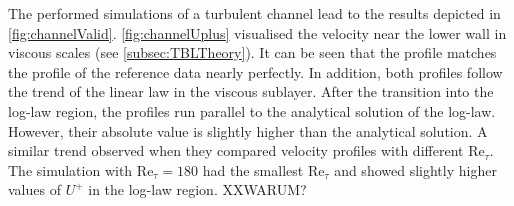 The performed simulations of a turbulent channel lead to the results depicted in \autoref{fig:channelValid}.
\autoref{fig:channelUplus} visualised the velocity near the lower wall in viscous scales (see \autoref{subsec:TBLTheory}).
It can be seen that the profile matches the profile of the reference data nearly perfectly.
In addition, both profiles follow the trend of the linear law in the viscous sublayer. 
After the transition into the log-law region, the profiles run parallel to the analytical solution of the log-law.
However, their absolute value is slightly higher than the analytical solution.
A similar trend \citep{lee_direct_2015} observed when they compared velocity profiles with different $\mathrm{Re}_{\tau}$.
The simulation with $\mathrm{Re}_{\tau} = 180$ had the smallest $\mathrm{Re}_{\tau}$ and showed slightly higher values of $U^+$ in the log-law region.
XXWARUM?

